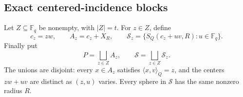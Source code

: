 \documentclass[11pt,letterpaper]{amsart}
\theoremstyle{definition}
\theoremstyle{remark}
\newcommand{\1}{\mathbf 1}
\newcommand{\ip}[2]{\langle #1,#2\rangle_Q}
\begin{document}
\subsection{Exact centered-incidence blocks}

Let $Z\subseteq\mathbb F_q$ be nonempty, with $|Z|=t$.  For $z\in Z$, define
\begin{equation}\label{eq:fixed-block-def}
 c_z=zw,
 \qquad
 A_z=c_z+X_R,
 \qquad
 \mathcal S_z=\{S_Q(c_z+uv,R):u\in\mathbb F_q\}.
\end{equation}
Finally put
\begin{equation}\label{eq:fixed-global-def}
 P=\bigsqcup_{z\in Z}A_z,
 \qquad
 \mathcal S=\bigsqcup_{z\in Z}\mathcal S_z.
\end{equation}
The unions are disjoint: every $x\in A_z$ satisfies $\ip{x}{v}=z$, and the centers $zw+uv$ are distinct as $(z,u)$ varies.  Every sphere in $\mathcal S$ has the same nonzero radius $R$.
\end{document}
